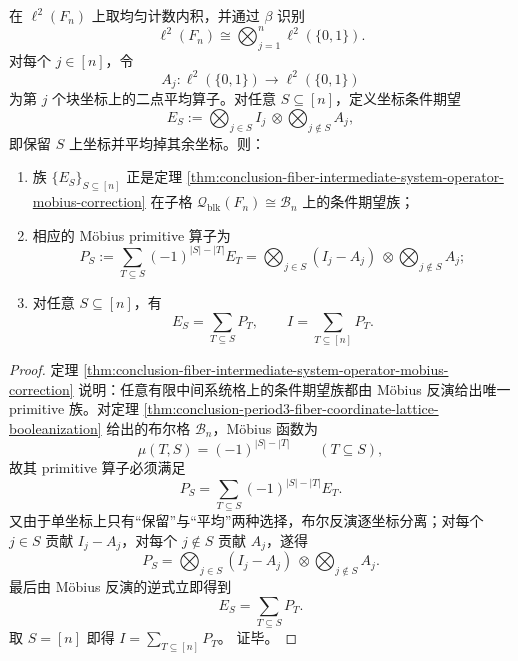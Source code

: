 \begin{theorem}\label{thm:conclusion-period3-fiber-mobius-walsh-tensorization}
在 \(\ell^2(F_n)\) 上取均匀计数内积，并通过 \(\beta\) 识别
\[
\ell^2(F_n)\cong \bigotimes_{j=1}^{n}\ell^2(\{0,1\}).
\]
对每个 \(j\in[n]\)，令
\[
A_j:\ell^2(\{0,1\})\to \ell^2(\{0,1\})
\]
为第 \(j\) 个块坐标上的二点平均算子。对任意 \(S\subseteq[n]\)，定义坐标条件期望
\[
E_S:=\bigotimes_{j\in S}I_j\ \otimes \!\!\bigotimes_{j\notin S}A_j,
\]
即保留 \(S\) 上坐标并平均掉其余坐标。则：
\begin{enumerate}
  \item 族 \(\{E_S\}_{S\subseteq[n]}\) 正是定理 \ref{thm:conclusion-fiber-intermediate-system-operator-mobius-correction} 在子格 \(\mathcal Q_{\mathrm{blk}}(F_n)\cong\mathcal B_n\) 上的条件期望族；
  \item 相应的 Möbius primitive 算子为
  \[
  P_S:=\sum_{T\subseteq S}(-1)^{|S|-|T|}E_T
  =
  \bigotimes_{j\in S}(I_j-A_j)\ \otimes \!\!\bigotimes_{j\notin S}A_j;
  \]
  \item 对任意 \(S\subseteq[n]\)，有
  \[
  E_S=\sum_{T\subseteq S}P_T,
  \qquad
  I=\sum_{T\subseteq[n]}P_T.
  \]
\end{enumerate}
\end{theorem}
\begin{proof}
定理 \ref{thm:conclusion-fiber-intermediate-system-operator-mobius-correction} 说明：任意有限中间系统格上的条件期望族都由 Möbius 反演给出唯一 primitive 族。对定理 \ref{thm:conclusion-period3-fiber-coordinate-lattice-booleanization} 给出的布尔格 \(\mathcal B_n\)，Möbius 函数为
\[
\mu(T,S)=(-1)^{|S|-|T|}
\qquad(T\subseteq S),
\]
故其 primitive 算子必须满足
\[
P_S=\sum_{T\subseteq S}(-1)^{|S|-|T|}E_T.
\]
又由于单坐标上只有“保留”与“平均”两种选择，布尔反演逐坐标分离；对每个 \(j\in S\) 贡献 \(I_j-A_j\)，对每个 \(j\notin S\) 贡献 \(A_j\)，遂得
\[
P_S=
\bigotimes_{j\in S}(I_j-A_j)\ \otimes \!\!\bigotimes_{j\notin S}A_j.
\]
最后由 Möbius 反演的逆式立即得到
\[
E_S=\sum_{T\subseteq S}P_T.
\]
取 \(S=[n]\) 即得
\(
I=\sum_{T\subseteq[n]}P_T
\)。
证毕。
\end{proof}

